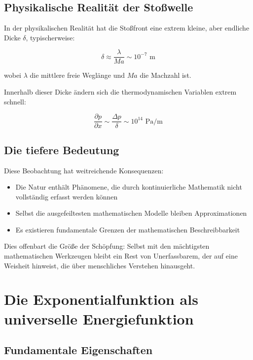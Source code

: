 ﻿\documentclass[12pt,a4paper]{article}
\theoremstyle{definition}
\theoremstyle{remark}
\begin{document}
\subsection{Physikalische Realität der Stoßwelle}

In der physikalischen Realität hat die Stoßfront eine extrem kleine, aber endliche Dicke $\delta$, typischerweise:

\begin{equation}
\delta \approx \frac{\lambda}{Ma} \sim 10^{-7} \text{ m}
\end{equation}

wobei $\lambda$ die mittlere freie Weglänge und $Ma$ die Machzahl ist.

Innerhalb dieser Dicke ändern sich die thermodynamischen Variablen extrem schnell:

\begin{equation}
\frac{\partial p}{\partial x} \sim \frac{\Delta p}{\delta} \sim 10^{14} \text{ Pa/m}
\end{equation}

\subsection{Die tiefere Bedeutung}

Diese Beobachtung hat weitreichende Konsequenzen:

\begin{itemize}
\item Die Natur enthält Phänomene, die durch kontinuierliche Mathematik nicht vollstän\-dig erfasst werden können
\item Selbst die ausgefeiltesten mathematischen Modelle bleiben Approximationen
\item Es existieren fundamentale Grenzen der mathematischen Beschreibbarkeit
\end{itemize}

Dies offenbart die Größe der Schöpfung: Selbst mit den mächtigsten mathematischen Werkzeugen bleibt ein Rest von Unerfassbarem, der auf eine Weisheit hinweist, die über menschliches Verstehen hinausgeht.

\section{Die Exponentialfunktion als universelle Energiefunktion}

\subsection{Fundamentale Eigenschaften}
\end{document}
